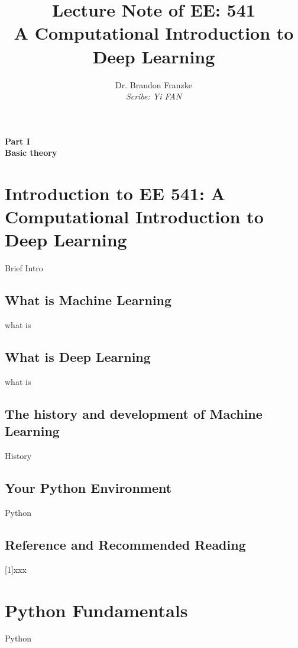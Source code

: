 \documentclass[a4paper,12pt]{article}
\title{\textbf{\Huge Lecture Note of EE: 541 \\ A Computational Introduction to Deep Learning}}
\author{\vspace{1cm} \Large Dr. Brandon Franzke \\[1cm] \normalsize \textit{Scribe: Yi FAN}}
\date{}
\begin{document}
\begin{titlepage}
    \centering
    \vspace*{2cm} %
    \maketitle %
    \vfill %
\end{titlepage}

\tableofcontents
\newpage

\clearpage
\begin{titlepage}
    \centering
    \vfill %
    {\Huge \textbf{Part I}}\\[1.5cm] %
    {\LARGE \textbf{Basic theory}} %
    \vfill %
\end{titlepage}
\section{Introduction to EE 541: A Computational Introduction to Deep Learning}
Brief Intro
\subsection{What is Machine Learning}
what is 
\subsection{What is Deep Learning}
what is
\subsection{The history and development of Machine Learning}
History
\subsection{Your Python Environment}
Python
\subsection{Reference and Recommended Reading}
[1]xxx


\clearpage
\section{Python Fundamentals}
Python
\end{document}
